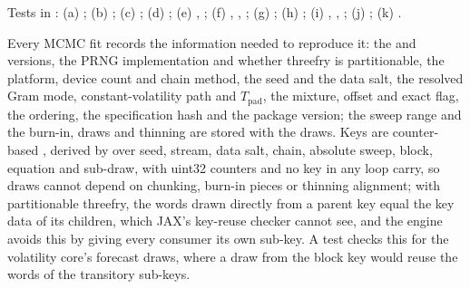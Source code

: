 \begin{table}[!htbp]
\medskip
\begin{minipage}{\linewidth}\footnotesize\raggedright
Tests in :
(a) ;
(b) ;
(c) ;
(d) ;
(e) ,
;
(f) ,
,
;
(g) ;
(h) ;
(i) ,
,
;
(j) ;
(k) .
\end{minipage}
\end{table}

Every MCMC fit records the information needed to reproduce it: the  and 
versions, the PRNG implementation and whether threefry is partitionable, the platform, device count
and chain method, the seed and the data salt, the resolved Gram mode, constant-volatility path and
$T_{\mathrm{pad}}$, the mixture, offset and exact flag, the ordering, the specification hash and the
package version; the sweep range and the burn-in, draws and thinning are stored with the draws.
Keys are counter-based \citep{salmon2011parallel}, derived by  over seed, stream, data
salt, chain, absolute sweep, block, equation and sub-draw, with uint32 counters and no key in any loop
carry, so draws cannot depend on chunking, burn-in pieces or thinning alignment; with partitionable
threefry, the words drawn directly from a parent key equal the key data of its 
children, which JAX's key-reuse checker cannot see, and the engine avoids this by giving every
consumer its own sub-key.
A test checks this for the volatility core's forecast draws, where a draw from the block key would
reuse the words of the transitory sub-keys. %

